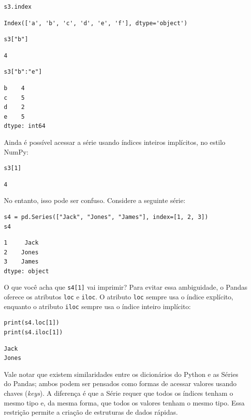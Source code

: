\documentclass[11pt,a4paper]{article}
\begin{document}
\begin{lstlisting}
s3.index
\end{lstlisting}
\begin{verbatim}
Index(['a', 'b', 'c', 'd', 'e', 'f'], dtype='object')
\end{verbatim}

\begin{lstlisting}
s3["b"]
\end{lstlisting}
\begin{verbatim}
4
\end{verbatim}

\begin{lstlisting}
s3["b":"e"]
\end{lstlisting}
\begin{verbatim}
b    4
c    5
d    2
e    5
dtype: int64
\end{verbatim}

Ainda é possível acessar a série usando índices inteiros implícitos, no estilo NumPy:

\begin{lstlisting}
s3[1]
\end{lstlisting}
\begin{verbatim}
4
\end{verbatim}

No entanto, isso pode ser confuso. Considere a seguinte série:

\begin{lstlisting}
s4 = pd.Series(["Jack", "Jones", "James"], index=[1, 2, 3])
s4
\end{lstlisting}
\begin{verbatim}
1     Jack
2    Jones
3    James
dtype: object
\end{verbatim}

O que você acha que \texttt{s4[1]} vai imprimir? Para evitar essa ambiguidade, o Pandas oferece os atributos \texttt{loc} e \texttt{iloc}. O atributo \texttt{loc} sempre usa o índice explícito, enquanto o atributo \texttt{iloc} sempre usa o índice inteiro implícito:

\begin{lstlisting}
print(s4.loc[1])
print(s4.iloc[1])
\end{lstlisting}
\begin{verbatim}
Jack
Jones
\end{verbatim}

Vale notar que existem similaridades entre os dicionários do Python e as Séries do Pandas; ambos podem ser pensados como formas de acessar valores usando chaves (\textit{keys}). A diferença é que a Série requer que todos os índices tenham o mesmo tipo e, da mesma forma, que todos os valores tenham o mesmo tipo. Essa restrição permite a criação de estruturas de dados rápidas.
\end{document}
